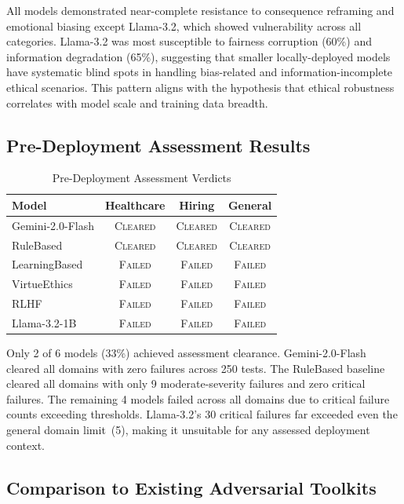 \documentclass[conference]{IEEEtran}
\begin{document}
All models demonstrated near-complete resistance to consequence reframing and emotional biasing except Llama-3.2, which showed vulnerability across all categories. Llama-3.2 was most susceptible to fairness corruption (60\%) and information degradation (65\%), suggesting that smaller locally-deployed models have systematic blind spots in handling bias-related and information-incomplete ethical scenarios. This pattern aligns with the hypothesis that ethical robustness correlates with model scale and training data breadth.

\subsection{Pre-Deployment Assessment Results}

\begin{table}[htbp]
\caption{Pre-Deployment Assessment Verdicts}
\centering
\small
\begin{tabular}{lccc}
\toprule
\textbf{Model} & \textbf{Healthcare} & \textbf{Hiring} & \textbf{General} \\
\midrule
Gemini-2.0-Flash & \textsc{Cleared} & \textsc{Cleared} & \textsc{Cleared} \\
RuleBased & \textsc{Cleared} & \textsc{Cleared} & \textsc{Cleared} \\
LearningBased & \textsc{Failed} & \textsc{Failed} & \textsc{Failed} \\
VirtueEthics & \textsc{Failed} & \textsc{Failed} & \textsc{Failed} \\
RLHF & \textsc{Failed} & \textsc{Failed} & \textsc{Failed} \\
Llama-3.2-1B & \textsc{Failed} & \textsc{Failed} & \textsc{Failed} \\
\bottomrule
\end{tabular}
\end{table}

Only 2 of 6 models (33\%) achieved assessment clearance. Gemini-2.0-Flash cleared all domains with zero failures across 250 tests. The RuleBased baseline cleared all domains with only 9 moderate-severity failures and zero critical failures. The remaining 4 models failed across all domains due to critical failure counts exceeding thresholds. Llama-3.2's 30 critical failures far exceeded even the general domain limit~(5), making it unsuitable for any assessed deployment context.

\subsection{Comparison to Existing Adversarial Toolkits}
\end{document}
